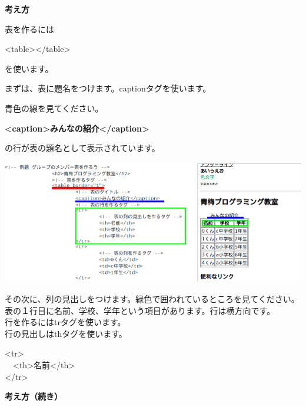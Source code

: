 \documentclass[a4paper,12pt]{jarticle}
\begin{document}
\bigskip

\flushleft
\textbf{考え方}



表を作るには

{\textless}table{\textgreater}{\textless}/table{\textgreater}

を使います。

まずは、表に題名をつけます。captionタグを使います。

青色の線を見てください。

\textbf{{\textless}caption{\textgreater}みんなの紹介{\textless}/caption{\textgreater}}

の行が表の題名として表示されています。



\bigskip

\includegraphics[width=13.462cm,height=5.387cm]{textbook-img190.png}


\bigskip

その次に、列の見出しをつけます。緑色で囲われているところを見てください。\\
表の１行目に名前、学校、学年という項目があります。行は横方向です。\\
行を作るにはtrタグを使います。\\
行の見出しはthタグを使います。\\


\bigskip

{\textless}tr{\textgreater}\\
\ \ {\textless}th{\textgreater}名前{\textless}/th{\textgreater}\\
{\textless}/tr{\textgreater}\\

\bigskip

\clearpage
\textbf{考え方（続き）}



\bigskip

\bigskip
\end{document}
